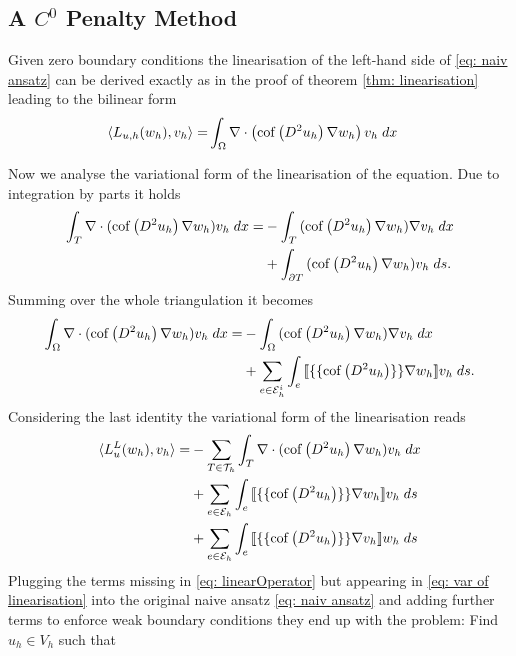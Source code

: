 \subsection{A $C^0$ Penalty Method }\label{sec: Brenner method}

Given zero boundary conditions the linearisation of the left-hand side of \eqref{eq: naiv ansatz} can be derived exactly as in the proof of theorem \ref{thm: linearisation} leading to the bilinear form
\begin{align}
\langle L_{u,h}(w_h),v_h\rangle =& \int_{\Omega} {{\nabla \cdot \left( \operatorname{cof} \left( D^2 u_h  \right) \nabla w_h \right) v_h}\;dx}
\label{eq: linearOperator}
\end{align}

Now we analyse the variational form of the linearisation of the \MA equation. Due to integration by parts it holds
\begin{align*}
  \int_{T} {{ \nabla \cdot (\operatorname{cof} \left( D^2 u_h \right) \nabla w_h) v_h}\;dx}
  	=& -\int_{T} {{ (\operatorname{cof} \left( D^2 u_h \right) \nabla w_h) \nabla v_h}\;dx} \\
  	&	+ \int_{\partial T} {{ (\operatorname{cof} \left( D^2 u_h \right) \nabla w_h) v_h}\;ds}.
\end{align*}
Summing over the whole triangulation it becomes
\begin{align*}
  \int_{\Omega} {{ \nabla \cdot (\operatorname{cof} \left( D^2 u_h \right) \nabla w_h) v_h}\;dx}
  	=& -\int_{\Omega} {{ (\operatorname{cof} \left( D^2 u_h \right) \nabla w_h) \nabla v_h}\;dx} \\
  	 &	+ \sum_{e \in \mathcal{E}_h^i} \int_{e} {{ \llbracket \{\{\operatorname{cof} \left( D^2 u_h \right) \}\} \nabla w_h\rrbracket v_h}\;ds}.
\end{align*}
Considering the last identity the variational form of the linearisation reads
\begin{align}
	\langle L^L_{u}(w_h),v_h\rangle 
	    =&- \sum_{T \in \mathcal{T}_h}  \int_{T} {{ \nabla \cdot (\operatorname{cof} \left( D^2 u_h \right) \nabla w_h) v_h}\;dx} \nonumber \\
	    	&+ \sum_{e \in \mathcal{E}_h} \int_{e} {{ \llbracket \{\{\operatorname{cof} \left( D^2 u_h \right) \}\} \nabla w_h\rrbracket v_h}\;ds} \nonumber \\
	    	&+ \sum_{e \in \mathcal{E}_h} \int_{e} {{ \llbracket \{\{\operatorname{cof} \left( D^2 u_h \right) \}\} \nabla v_h\rrbracket w_h}\;ds} \label{eq: var of linearisation}
\end{align}
Plugging the terms missing in \eqref{eq: linearOperator} but appearing in \eqref{eq: var of linearisation} into the original naive ansatz \eqref{eq: naiv ansatz} and adding further terms to enforce weak boundary conditions they end up with the problem: Find $u_h \in V_h$ such that
